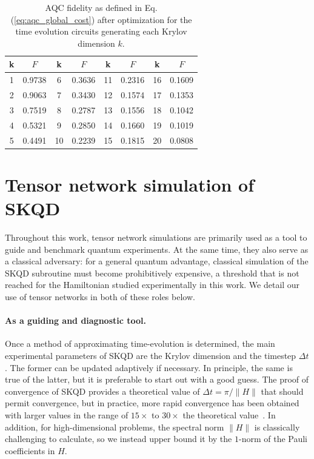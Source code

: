 \documentclass[
  reprint,            %
  amsmath,amssymb,
  aps,
  superscriptaddress, %
  longbibliography
]{revtex4-2}
\theoremstyle{definition}
\begin{document}
\begin{table}[h!]
\centering
\begin{tabular}{cccccccc}
\hline
\textbf{k} & \textbf{$F$} & \textbf{k} & \textbf{$F$} & \textbf{k} & \textbf{$F$} & \textbf{k} & \textbf{$F$} \\
\hline
1  & 0.9738 & 6  & 0.3636 & 11 & 0.2316 & 16 & 0.1609 \\
2  & 0.9063 & 7  & 0.3430 & 12 & 0.1574 & 17 & 0.1353 \\
3  & 0.7519 & 8  & 0.2787 & 13 & 0.1556 & 18 & 0.1042 \\
4  & 0.5321 & 9  & 0.2850 & 14 & 0.1660 & 19 & 0.1019 \\
5  & 0.4491 & 10 & 0.2239 & 15 & 0.1815 & 20 & 0.0808 \\
\hline
\end{tabular}
\caption{AQC fidelity as defined in Eq. (\ref{eq:aqc_global_cost}) after optimization for the time evolution circuits generating each Krylov dimension $k$.}
\label{tab:aqc_fidelity}
\end{table}


\section{Tensor network simulation of SKQD}
\label{app:tn_sims}

Throughout this work, tensor network simulations are primarily used as a tool to guide and benchmark quantum experiments. At the same time, they also serve as a classical adversary: for a general quantum advantage, classical simulation of the SKQD subroutine must become prohibitively expensive, a threshold that is not reached for the Hamiltonian studied experimentally in this work. We detail our use of tensor networks in both of these roles below.

\paragraph{As a guiding and diagnostic tool.}
Once a method of approximating time-evolution is determined, the main experimental parameters of SKQD are the Krylov dimension and the timestep $\Delta t$.
The former can be updated adaptively if necessary.
In principle, the same is true of the latter, but it is preferable to start out with a good guess.
The proof of convergence of SKQD provides a theoretical value of $\Delta t = \pi/\|H\|$ that should permit convergence, but in practice, more rapid convergence has been obtained with larger values in the range of $15\times$ to $30\times$ the theoretical value~\cite{yu2025quantum}.
In addition, for high-dimensional problems, the spectral norm $\|H\|$ is classically challenging to calculate, so we instead upper bound it by the $1$-norm of the Pauli coefficients in $H$.
\end{document}
